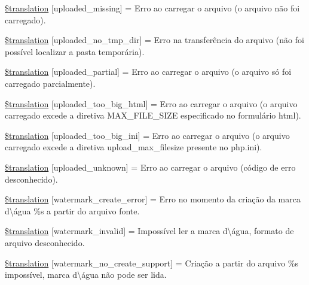 \begin{DoxyCompactItemize}
\item 
\hyperlink{class_8upload_8pt___b_r_8php_a0cce433260be65f1f35853a6b4b8952b}{\$translation} \mbox{[}\textquotesingle{}uploaded\+\_\+missing\textquotesingle{}\mbox{]} = \textquotesingle{}Erro ao carregar o arquivo (o arquivo não foi carregado).\textquotesingle{}
\item 
\hyperlink{class_8upload_8pt___b_r_8php_ae3cdc68fe248399f77246c91b0555341}{\$translation} \mbox{[}\textquotesingle{}uploaded\+\_\+no\+\_\+tmp\+\_\+dir\textquotesingle{}\mbox{]} = \textquotesingle{}Erro na transferência do arquivo (não foi possível localizar a pasta temporária).\textquotesingle{}
\item 
\hyperlink{class_8upload_8pt___b_r_8php_a967c17da21b0a2d3bd65cca3a9ca0ea8}{\$translation} \mbox{[}\textquotesingle{}uploaded\+\_\+partial\textquotesingle{}\mbox{]} = \textquotesingle{}Erro ao carregar o arquivo (o arquivo só foi carregado parcialmente).\textquotesingle{}
\item 
\hyperlink{class_8upload_8pt___b_r_8php_a623d5b8b92169f57d7e43458aa911cbb}{\$translation} \mbox{[}\textquotesingle{}uploaded\+\_\+too\+\_\+big\+\_\+html\textquotesingle{}\mbox{]} = \textquotesingle{}Erro ao carregar o arquivo (o arquivo carregado excede a diretiva M\+A\+X\+\_\+\+F\+I\+L\+E\+\_\+\+S\+I\+Z\+E especificado no formulário html).\textquotesingle{}
\item 
\hyperlink{class_8upload_8pt___b_r_8php_a6a08dcd0d3651fdd098568f6b2f0a42c}{\$translation} \mbox{[}\textquotesingle{}uploaded\+\_\+too\+\_\+big\+\_\+ini\textquotesingle{}\mbox{]} = \textquotesingle{}Erro ao carregar o arquivo (o arquivo carregado excede a diretiva upload\+\_\+max\+\_\+filesize presente no php.\+ini).\textquotesingle{}
\item 
\hyperlink{class_8upload_8pt___b_r_8php_a4a9168e922b827e6a28b5db1c00774ca}{\$translation} \mbox{[}\textquotesingle{}uploaded\+\_\+unknown\textquotesingle{}\mbox{]} = \textquotesingle{}Erro ao carregar o arquivo (código de erro desconhecido).\textquotesingle{}
\item 
\hyperlink{class_8upload_8pt___b_r_8php_aabca0b65dadbc6184415c16375f284ca}{\$translation} \mbox{[}\textquotesingle{}watermark\+\_\+create\+\_\+error\textquotesingle{}\mbox{]} = \textquotesingle{}Erro no momento da criação da marca d\textbackslash{}\textquotesingle{}água \%s a partir do arquivo fonte.\textquotesingle{}
\item 
\hyperlink{class_8upload_8pt___b_r_8php_ac336e7a5701e47ba4a05e9e498a3cc44}{\$translation} \mbox{[}\textquotesingle{}watermark\+\_\+invalid\textquotesingle{}\mbox{]} = \textquotesingle{}Impossível ler a marca d\textbackslash{}\textquotesingle{}água, formato de arquivo desconhecido.\textquotesingle{}
\item 
\hyperlink{class_8upload_8pt___b_r_8php_a82d5853430ab72dc1f9799ec36144cc6}{\$translation} \mbox{[}\textquotesingle{}watermark\+\_\+no\+\_\+create\+\_\+support\textquotesingle{}\mbox{]} = \textquotesingle{}Criação a partir do arquivo \%s impossível, marca d\textbackslash{}\textquotesingle{}água não pode ser lida.\textquotesingle{}
\end{DoxyCompactItemize}


